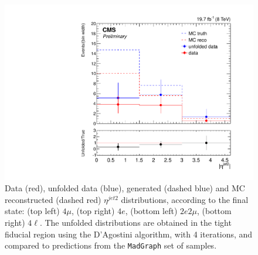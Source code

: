 \begin{figure}[hbtp]
\begin{center}
    \includegraphics[width=\cmsFigWidth]{Figures/EtaJet2_ZZTo4l_Mad_fr}       
    \caption{\footnotesize{Data (red), unfolded data (blue), generated (dashed blue) and MC reconstructed (dashed red) $\eta^{jet2}$ distributions, according to the final state: (top left) $4\mu$, (top right) $4e$, (bottom left) $2e2\mu$, (bottom right) $4\ell$. The unfolded distributions are obtained in the tight fiducial region using the D'Agostini algorithm, with 4 iterations, and compared to predictions from the \texttt{MadGraph} set of samples.}} 
    \label{fig:EtaJet2_unfolding}
  \end{center}
\end{figure}
\clearpage
